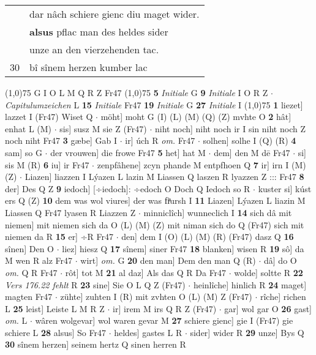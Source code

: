 \documentclass[8pt,a4paper,notitlepage]{article}
\begin{document}
\begin{table}[ht]
\begin{minipage}[t]{0.5\linewidth}
\begin{tabular}{rl}
 & dar nâch schiere gienc diu maget wider.\\ 
 & \textbf{alsus} pflac man des heldes sider\\ 
 & unze an den vierzehenden tac.\\ 
30 & bî sînem herzen kumber lac\\ 
\end{tabular}
\scriptsize
\line(1,0){75} \newline
G I O L M Q R Z Fr47 \newline
\line(1,0){75} \newline
\textbf{5} \textit{Initiale} G  \textbf{9} \textit{Initiale} I O R Z   $\cdot$ \textit{Capitulumzeichen} L  \textbf{15} \textit{Initiale} Fr47  \textbf{19} \textit{Initiale} G  \textbf{27} \textit{Initiale} I  \newline
\line(1,0){75} \newline
\textbf{1} liezet] lazzet I (Fr47) Wiset Q  $\cdot$ möht] moht G (I) (L) (M) (Q) (Z) mvhte O \textbf{2} hât] enhat L (M)  $\cdot$ sis] susz M sie Z (Fr47)  $\cdot$ niht noch] niht noch ir I sin niht noch Z noch niht Fr47 \textbf{3} gæbe] Gab I  $\cdot$ ir] úch R \textit{om.} Fr47  $\cdot$ solhen] solhe I (Q) (R) \textbf{4} sam] so G  $\cdot$ der vrouwen] die frowe Fr47 \textbf{5} het] hat M  $\cdot$ dem] den M dē Fr47  $\cdot$ si] sis M (R) \textbf{6} iu] ir Fr47  $\cdot$ zenpfâhene] zcyn phande M entpfhoen Q \textbf{7} ir] irn I (M) (Z)  $\cdot$ Liazen] liazzen I Lýazen L lazin M Liassen Q laszen R lyazzen Z ::: Fr47 \textbf{8} der] Des Q Z \textbf{9} iedoch] [÷iedoch]: ÷edoch O Doch Q Iedoch so R  $\cdot$ kuster si] kúst ers Q (Z) \textbf{10} dem was wol viures] der was fiͤursh I \textbf{11} Liazen] Lýazen L liazin M Liassen Q Fr47 lyasen R Liazzen Z  $\cdot$ minniclîch] wunneclich I \textbf{14} sich dâ mit niemen] mit niemen sich da O (L) (M) (Z) mit niman sich do Q (Fr47) sich mit niemen da R \textbf{15} er] ÷R Fr47  $\cdot$ den] dem I (O) (L) (M) (R) (Fr47) dasz Q \textbf{16} sînen] Den O  $\cdot$ liez] hiesz Q \textbf{17} sînem] siner Fr47 \textbf{18} blanken] wisen R \textbf{19} sô] da M wen R alz Fr47  $\cdot$ wirt] \textit{om.} G \textbf{20} den man] Dem den man Q (R)  $\cdot$ dâ] do O \textit{om.} Q R Fr47  $\cdot$ rôt] tot M \textbf{21} al daz] Als das Q R Da Fr47  $\cdot$ wolde] soltte R \textbf{22} \textit{Vers 176.22 fehlt} R  \textbf{23} sine] Sie O L Q Z (Fr47)  $\cdot$ heinlîche] hinlich R \textbf{24} maget] magten Fr47  $\cdot$ zühte] zuhten I (R) mit zvhten O (L) (M) Z (Fr47)  $\cdot$ rîche] richen L \textbf{25} leist] Leiste L M R Z  $\cdot$ ir] irem M irs Q R Z (Fr47)  $\cdot$ gar] wol gar O \textbf{26} gast] \textit{om.} L  $\cdot$ wâren wolgevar] wol waren gevar M \textbf{27} schiere gienc] gie I (Fr47) gie schiere L \textbf{28} alsus] So Fr47  $\cdot$ heldes] gastes L R  $\cdot$ sider] wider R \textbf{29} unze] Bys Q \textbf{30} sînem herzen] seinem hertz Q sinen herren R \newline

\end{minipage}
\end{table}
\end{document}
